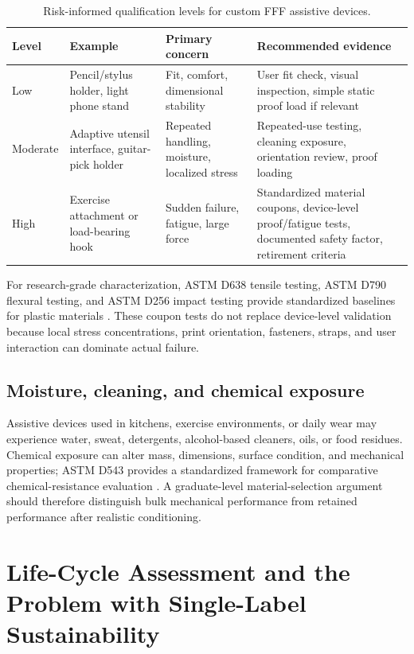 \documentclass[11pt]{article}
\begin{document}
\begin{table}[htbp]
\centering
\small
\caption{Risk-informed qualification levels for custom FFF assistive devices.}
\begin{tabularx}{\textwidth}{@{}p{}p{}YY@{}}
\toprule
\textbf{Level} & \textbf{Example} & \textbf{Primary concern} & \textbf{Recommended evidence} \\
\midrule
Low & Pencil/stylus holder, light phone stand & Fit, comfort, dimensional stability & User fit check, visual inspection, simple static proof load if relevant \\
Moderate & Adaptive utensil interface, guitar-pick holder & Repeated handling, moisture, localized stress & Repeated-use testing, cleaning exposure, orientation review, proof loading \\
High & Exercise attachment or load-bearing hook & Sudden failure, fatigue, large force & Standardized material coupons, device-level proof/fatigue tests, documented safety factor, retirement criteria \\
\bottomrule
\end{tabularx}
\end{table}

For research-grade characterization, ASTM D638 tensile testing, ASTM D790 flexural testing, and ASTM D256 impact testing provide standardized baselines for plastic materials \cite{astmd638,astmd790,astmd256}. These coupon tests do not replace device-level validation because local stress concentrations, print orientation, fasteners, straps, and user interaction can dominate actual failure.

\subsection{Moisture, cleaning, and chemical exposure}

Assistive devices used in kitchens, exercise environments, or daily wear may experience water, sweat, detergents, alcohol-based cleaners, oils, or food residues. Chemical exposure can alter mass, dimensions, surface condition, and mechanical properties; ASTM D543 provides a standardized framework for comparative chemical-resistance evaluation \cite{astmd543}. A graduate-level material-selection argument should therefore distinguish bulk mechanical performance from retained performance after realistic conditioning.

\section{Life-Cycle Assessment and the Problem with Single-Label Sustainability}
\end{document}
